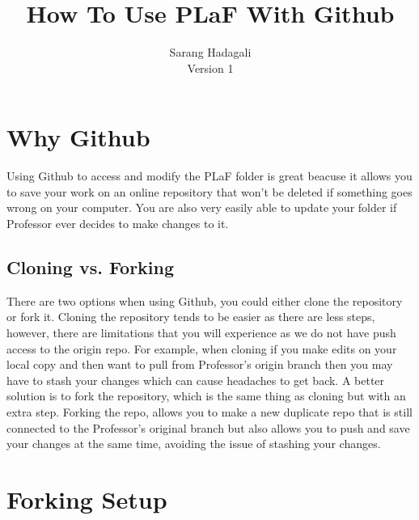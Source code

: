 \documentclass{article}
\title{How To Use PLaF With Github}
\author{Sarang Hadagali \\ Version 1}
\begin{document}
\maketitle

\section{Why Github}

Using Github to access and modify the PLaF folder is great beacuse it allows you to save your work on an online repository that won't be deleted if something goes wrong on your computer. You are also very easily able to update your folder if Professor ever decides to make changes to it. \\



\subsection{Cloning vs. Forking}
There are two options when using Github, you could either clone the repository or fork it. Cloning the repository tends to be easier as there are less steps, however, there are limitations that you will experience as we do not have push access to the origin repo. For example, when cloning if you make edits on your local copy and then want to pull from Professor's origin branch then you may have to stash your changes which can cause headaches to get back. A better solution is to fork the repository, which is the same thing as cloning but with an extra step. Forking the repo, allows you to make a new duplicate repo that is still connected to the Professor's original branch but also allows you to push and save your changes at the same time, avoiding the issue of stashing your changes.


\section{Forking Setup}
\end{document}
